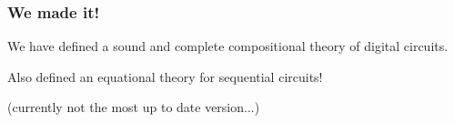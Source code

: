 \begin{frame}
    \frametitle{We made it!}

    We have defined a \alert{sound and complete} compositional
    theory of digital circuits.

    \pause

    Also defined an \alert{equational theory} for sequential circuits!

    \pause

    \nocite{circuits}

    \printbibliography[heading=none]
    \scriptsize
    (currently not the most up to date version...)

\end{frame}